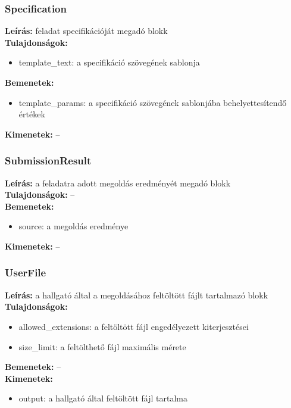 \subsubsection{Specification}
\textbf{Leírás:} feladat specifikációját megadó blokk \\
\textbf{Tulajdonságok:}
\begin{itemize}
    \item template\_text: a specifikáció szövegének sablonja
\end{itemize}
\textbf{Bemenetek:}
\begin{itemize}
    \item template\_params: a specifikáció szövegének sablonjába behelyettesítendő értékek
\end{itemize}
\textbf{Kimenetek:} --

\subsubsection{SubmissionResult}
\textbf{Leírás:} a feladatra adott megoldás eredményét megadó blokk \\
\textbf{Tulajdonságok:} -- \\
\textbf{Bemenetek:}
\begin{itemize}
    \item source: a megoldás eredménye
\end{itemize}
\textbf{Kimenetek:} --

\subsubsection{UserFile}
\textbf{Leírás:} a hallgató által a megoldásához feltöltött fájlt tartalmazó blokk \\
\textbf{Tulajdonságok:}
\begin{itemize}
    \item allowed\_extensions: a feltöltött fájl engedélyezett kiterjesztései
    \item size\_limit: a feltölthető fájl maximális mérete
\end{itemize}
\textbf{Bemenetek:} -- \\
\textbf{Kimenetek:}
\begin{itemize}
    \item output: a hallgató által feltöltött fájl tartalma
\end{itemize}
